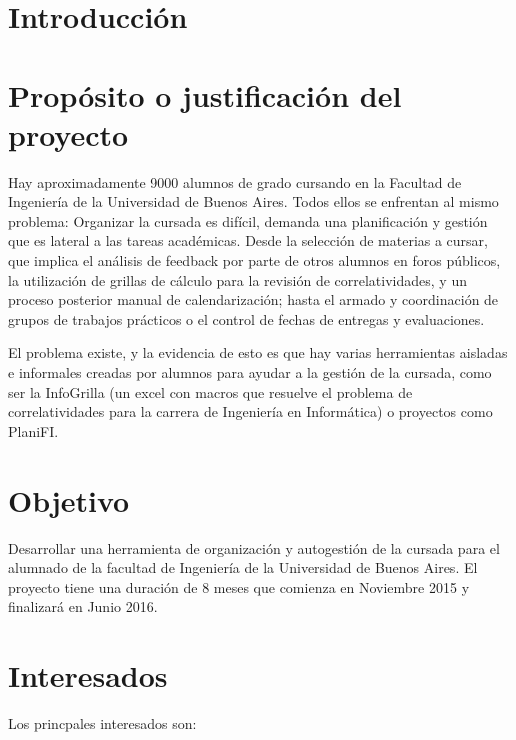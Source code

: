 \documentclass[a4paper,11pt]{article}
\begin{document}

\section{Introducción}
\baselineskip=18pt

\section{Propósito o justificación del proyecto}

  Hay aproximadamente 9000 alumnos de grado cursando en la Facultad de
  Ingeniería de la Universidad de Buenos Aires. Todos ellos se enfrentan al
  mismo problema: Organizar la cursada es difícil, demanda una planificación y
  gestión que es lateral a las tareas académicas. Desde la selección de
  materias a cursar, que implica el análisis de feedback por parte de otros
  alumnos en foros públicos, la utilización de grillas de cálculo para la
  revisión de correlatividades, y un proceso posterior manual de
  calendarización; hasta el armado y coordinación de grupos de trabajos
  prácticos o el control de fechas de entregas y evaluaciones.

  El problema existe, y la evidencia de esto es que hay varias herramientas
  aisladas e informales creadas por alumnos para ayudar a la gestión de la
  cursada, como ser la InfoGrilla (un excel con macros que resuelve el problema
  de correlatividades para la carrera de Ingeniería en Informática) o proyectos
  como PlaniFI.

\section{Objetivo}

  Desarrollar una herramienta de organización y autogestión de la cursada para
  el alumnado de la facultad de Ingeniería de la Universidad de Buenos Aires.
  El proyecto tiene una duración de 8 meses que comienza en Noviembre 2015 y
  finalizará en Junio 2016. 

\section{Interesados}

  Los princpales interesados son:
\end{document}
